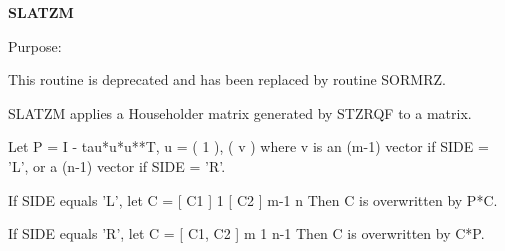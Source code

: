 {\bfseries S\+L\+A\+T\+Z\+M} 

 \begin{DoxyParagraph}{Purpose\+: }
\begin{DoxyVerb} This routine is deprecated and has been replaced by routine SORMRZ.

 SLATZM applies a Householder matrix generated by STZRQF to a matrix.

 Let P = I - tau*u*u**T,   u = ( 1 ),
                               ( v )
 where v is an (m-1) vector if SIDE = 'L', or a (n-1) vector if
 SIDE = 'R'.

 If SIDE equals 'L', let
        C = [ C1 ] 1
            [ C2 ] m-1
              n
 Then C is overwritten by P*C.

 If SIDE equals 'R', let
        C = [ C1, C2 ] m
               1  n-1
 Then C is overwritten by C*P.\end{DoxyVerb}
 
\end{DoxyParagraph}

